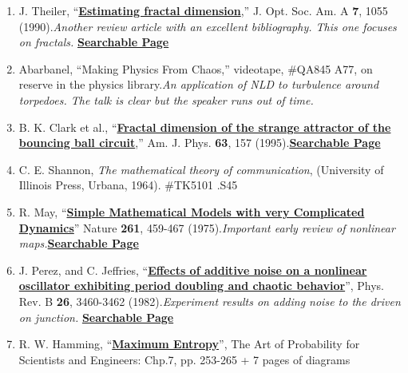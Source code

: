 \documentclass{../lab}
\begin{document}
\begin{enumerate}
    \item J. Theiler, ``\href{http://www.opticsinfobase.org/abstract.cfm?uri=josaa-7-6-1055}{\textbf{Estimating fractal dimension}},'' J. Opt. Soc. Am. A \textbf{7}, 1055 (1990).\emph{Another review article with an excellent bibliography. This one focuses on fractals. } \href{http://physics111.lib.berkeley.edu/Physics111/Reprints/NLD/16-Estimating\_Fractal\_Dimension.pdf}{\textbf{Searchable Page}}

    \item Abarbanel, ``Making Physics From Chaos,'' videotape, \#QA845 A77, on reserve in the physics library.\emph{An application of NLD to turbulence around torpedoes. The talk is clear but the speaker runs out of time.}

    \item B. K. Clark et al., ``\href{http://ajp.aapt.org/resource/1/ajpias/v63/i2/p157\_s1}{\textbf{Fractal dimension of the strange attractor of the bouncing ball circuit}},'' Am. J. Phys. \textbf{63}, 157 (1995).\href{http://physics111.lib.berkeley.edu/Physics111/Reprints/NLD/15-Fractal\_Dimension.pdf}{\textbf{Searchable Page}}

    \item C. E. Shannon, \emph{The mathematical theory of communication}, (University of Illinois Press, Urbana, 1964). \#TK5101 .S45

    \item R. May, ``\href{http://www.nature.com/nature/journal/v261/n5560/abs/261459a0.html}{\textbf{Simple Mathematical Models with very Complicated Dynamics}}'' Nature \textbf{261}, 459-467 (1975).\emph{Important early review of nonlinear maps.}\href{http://physics111.lib.berkeley.edu/Physics111/Reprints/NLD/04-Simple\_Mathematical\_Models.pdf}{\textbf{Searchable Page}}

    \item J. Perez, and C. Jeffries, ``\href{http://prb.aps.org/abstract/PRB/v26/i6/p3460\_1}{\textbf{Effects of additive noise on a nonlinear oscillator exhibiting period doubling and chaotic behavior}}'', Phys. Rev. B \textbf{26}, 3460-3462 (1982).\emph{Experiment results on adding noise to the driven on junction.} \href{http://physics111.lib.berkeley.edu/Physics111/Reprints/NLD/10-Effects\_of\_Additive\_Noise.pdf}{\textbf{Searchable Page}}

    \item R. W. Hamming, ``\href{http://physics111.lib.berkeley.edu/Physics111/Reprints/NLD/12-Maximum\_Entropy.pdf}{\textbf{Maximum Entropy}}'', The Art of Probability for Scientists and Engineers: Chp.7, pp. 253-265 + 7 pages of diagrams


\end{enumerate}
\end{document}
